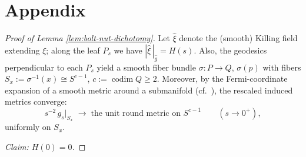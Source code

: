 \documentclass[11pt]{amsart}
\theoremstyle{plain}
\numberwithin{equation}{section}
\theoremstyle{definition}
\theoremstyle{remark}
\begin{document}
\section{Appendix}



\begin{proof}[Proof of Lemma \ref{lem:bolt-nut-dichotomy}]
Let $\widehat{\xi}$ denote the (smooth) Killing field extending $\xi$; along the leaf $P_s$ we have
$|\widehat{\xi}\,|_{\widehat{g}} = H(s)$. Also, the geodesics perpendicular to each $P_s$ yield a smooth fiber bundle $\sigma : P \to Q$, $\sigma(p)$ with fibers $S_x := \sigma^{-1}(x) \cong S^{c-1}$, $c := \operatorname{codim} Q \geq 2$. Moreover, by the Fermi-coordinate expansion of a smooth metric around a submanifold
\cite[Ch.~9]{GrayTubes} (cf.\ \cite[\S1]{EschenburgWang}), the rescaled induced
metrics converge:
\begin{equation}\label{eq:roundlimit}
	s^{-2}\, g_s \big|_{S_x} \;\longrightarrow\; \text{the unit round metric on }
	S^{c-1} \qquad (s \to 0^+),
\end{equation}
uniformly on $S_x$.



\emph{Claim: $H(0) = 0$.}


\end{proof}
\end{document}
